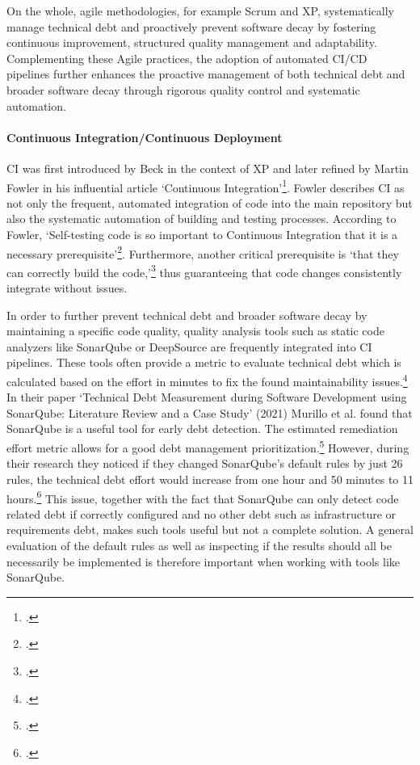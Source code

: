 On the whole, agile methodologies, for example Scrum and \ac{XP}, systematically manage technical debt and proactively prevent software decay by fostering continuous improvement, structured quality management and adaptability.
Complementing these Agile practices, the adoption of automated \ac{CI/CD} pipelines further enhances the proactive management of both technical debt
and broader software decay through rigorous quality control and systematic automation.

\paragraph{Continuous Integration/Continuous Deployment}
\ac{CI} was first introduced by Beck in the context of \ac{XP} and later refined by Martin Fowler in his influential article `Continuous Integration'\footcite[no page number.]{fowlerContinuousIntegration2006}.
Fowler describes \ac{CI} as not only the frequent, automated integration of code into the main repository but also the systematic automation of building and testing processes.
According to Fowler, `Self-testing code is so important to Continuous Integration that it is a necessary prerequisite'\footcite[no page number]{fowlerContinuousIntegration2006}.
Furthermore, another critical prerequisite is `that they can correctly build the code,'\footcite[no page number]{fowlerContinuousIntegration2006} thus guaranteeing that code changes consistently
integrate without issues.

In order to further prevent technical debt and broader software decay by maintaining a specific code quality, quality analysis tools such as static code analyzers like SonarQube or DeepSource are frequently integrated into
\ac{CI} pipelines. These tools often provide a metric to evaluate technical debt which is calculated based on the effort in minutes to fix the found maintainability issues.\footcite[no page number]{sonarqubeUnderstandingMeasuresMetrics2025}
In their paper `Technical Debt Measurement during Software Development using SonarQube: Literature Review and a Case Study' (2021)
Murillo et al. found that SonarQube is a useful tool for early debt detection. The estimated remediation effort metric allows for a good debt management prioritization.\footcite[5]{murilloTechnicalDebtMeasurement2021}
However, during their research they noticed if they changed SonarQube's default rules by just 26 rules, the technical debt effort would increase from
one hour and 50 minutes to 11 hours.\footcite[4]{murilloTechnicalDebtMeasurement2021} This issue, together with the fact that SonarQube can only detect code related debt if correctly configured and no other debt such as
infrastructure or requirements debt, makes such tools useful but not a complete solution. A general evaluation of the default rules as well as inspecting if the results should all be necessarily be implemented is therefore important when working with tools like SonarQube.

